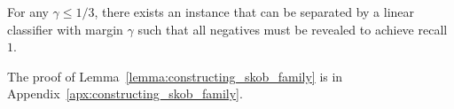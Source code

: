 
\begin{lemma}
\label{lemma:constructing_skob_family}
    For any $\gamma \leq 1/3$, there exists an instance that can be separated by a linear classifier with margin $\gamma$ such that all negatives must be revealed to achieve recall $1$. 
\end{lemma}

The proof of Lemma~\ref{lemma:constructing_skob_family} is in Appendix~\ref{apx:constructing_skob_family}.



